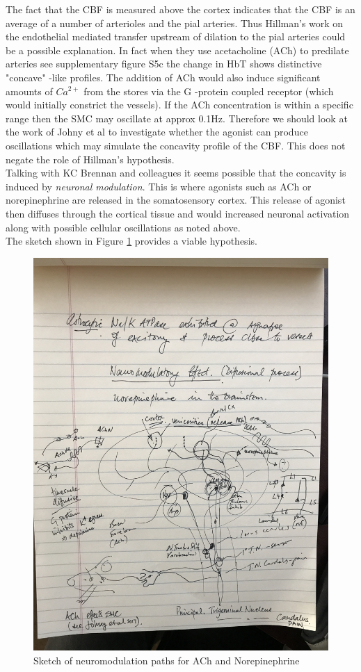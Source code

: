 \documentclass{article}
\begin{document}
{The fact that the CBF is measured above the cortex indicates that the CBF is an average of a number of arterioles and the pial arteries. Thus Hillman's work \cite{Chen2014a} on the endothelial mediated transfer upstream of dilation to the pial arteries could be a possible explanation. In fact when they use acetacholine (ACh) to predilate arteries see supplementary figure S5c the change in HbT shows distinctive "concave" -like profiles. The addition of ACh would also induce significant amounts of $Ca^{2+}$ from the stores via the G -protein coupled receptor (which would initially constrict the vessels). If the ACh concentration is within a specific range then the SMC may oscillate at approx 0.1Hz. Therefore we should look at the work of Johny et al \cite{Johny2017} to investigate whether the agonist can produce oscillations which may simulate the concavity profile of the CBF. This does not negate the role of Hillman's hypothesis.\\
Talking with KC Brennan and colleagues it seems possible that the concavity is induced by \textit{neuronal modulation}. This is where agonists such as ACh or norepinephrine are released in the somatosensory cortex. This release of agonist then diffuses through the cortical tissue and would increased neuronal activation along with possible cellular oscillations as noted above. \\
 The sketch shown in Figure \ref{fig:Neuromodulation_paths} provides a viable hypothesis. }
\begin{figure}[h!]
\centering
\includegraphics[width=0.7\linewidth, angle = -90]{./Figures/Neuromodulation_paths}
\caption{Sketch of neuromodulation paths for ACh and Norepinephrine}
\label{fig:Neuromodulation_paths}
\end{figure}
\end{document}
